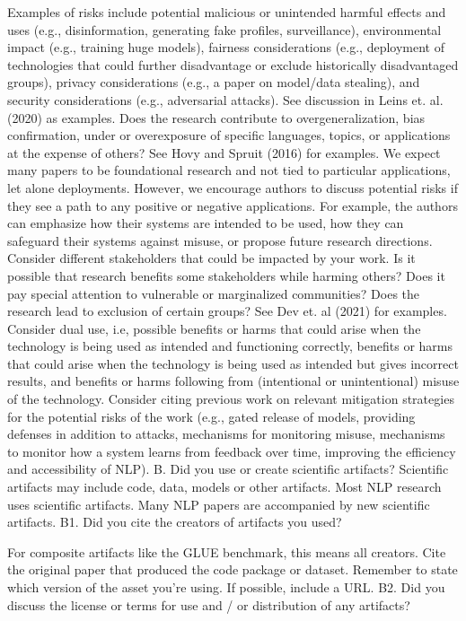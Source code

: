 Examples of risks include potential malicious or unintended harmful effects and uses (e.g., disinformation, generating fake profiles, surveillance), environmental impact (e.g., training huge models), fairness considerations (e.g., deployment of technologies that could further disadvantage or exclude historically disadvantaged groups), privacy considerations (e.g., a paper on model/data stealing), and security considerations (e.g., adversarial attacks). See discussion in Leins et. al. (2020) as examples.
Does the research contribute to overgeneralization, bias confirmation, under or overexposure of specific languages, topics, or applications at the expense of others? See Hovy and Spruit (2016) for examples.
We expect many papers to be foundational research and not tied to particular applications, let alone deployments. However, we encourage authors to discuss potential risks if they see a path to any positive or negative applications. For example, the authors can emphasize how their systems are intended to be used, how they can safeguard their systems against misuse, or propose future research directions.
Consider different stakeholders that could be impacted by your work. Is it possible that research benefits some stakeholders while harming others? Does it pay special attention to vulnerable or marginalized communities? Does the research lead to exclusion of certain groups? See Dev et. al (2021) for examples.
Consider dual use, i.e, possible benefits or harms that could arise when the technology is being used as intended and functioning correctly, benefits or harms that could arise when the technology is being used as intended but gives incorrect results, and benefits or harms following from (intentional or unintentional) misuse of the technology.
Consider citing previous work on relevant mitigation strategies for the potential risks of the work (e.g., gated release of models, providing defenses in addition to attacks, mechanisms for monitoring misuse, mechanisms to monitor how a system learns from feedback over time, improving the efficiency and accessibility of NLP).
B. Did you use or create scientific artifacts?
Scientific artifacts may include code, data, models or other artifacts.
Most NLP research uses scientific artifacts.
Many NLP papers are accompanied by new scientific artifacts.
B1. Did you cite the creators of artifacts you used?

For composite artifacts like the GLUE benchmark, this means all creators.
Cite the original paper that produced the code package or dataset.
Remember to state which version of the asset you’re using.
If possible, include a URL.
B2. Did you discuss the license or terms for use and / or distribution of any artifacts?


